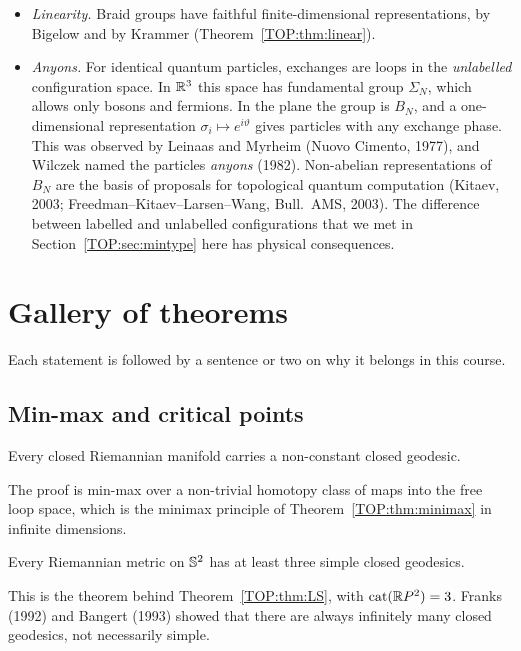 \begin{remark}\leavevmode
\begin{itemize}[nosep]
\item \emph{Linearity.} Braid groups have faithful finite-dimensional representations, by Bigelow and by
  Krammer (Theorem~\ref{TOP:thm:linear}).
\item \emph{Anyons.} For identical quantum particles, exchanges are loops in the \emph{unlabelled}
  configuration space. In $\mathbb{R}^3$ this space has fundamental group $\Sigma_N$, which allows only bosons and fermions. In the plane
  the group is $B_N$, and a one-dimensional representation $\sigma_i\mapsto e^{i\vartheta}$ gives particles with
  any exchange phase. This was observed by Leinaas and Myrheim (Nuovo Cimento, 1977), and Wilczek named the
  particles \emph{anyons} (1982). Non-abelian representations of $B_N$ are the basis of proposals for
  topological quantum computation (Kitaev, 2003; Freedman--Kitaev--Larsen--Wang, Bull.\ AMS, 2003). The
  difference between labelled and unlabelled configurations that we met in Section~\ref{TOP:sec:mintype}
  here has physical consequences.
\end{itemize}
\end{remark}

\section{Gallery of theorems}
\label{TOP:sec:gallery}

Each statement is followed by a sentence or two on why it belongs in this course.

\subsection*{Min-max and critical points}

\begin{theorem}
Every closed Riemannian manifold carries a non-constant closed geodesic.
\end{theorem}
\noindent The proof is min-max over a non-trivial homotopy class of maps into the free loop space, which
is the minimax principle of Theorem~\ref{TOP:thm:minimax} in infinite dimensions.

\begin{theorem}
Every Riemannian metric on $\mathbb{S}^2$ has at least three simple closed geodesics.
\end{theorem}
\noindent This is the theorem behind Theorem~\ref{TOP:thm:LS}, with $\operatorname{cat}(\mathbb{R} P^2)=3$.
Franks (1992) and Bangert (1993) showed that there are always infinitely many closed geodesics, not
necessarily simple.

